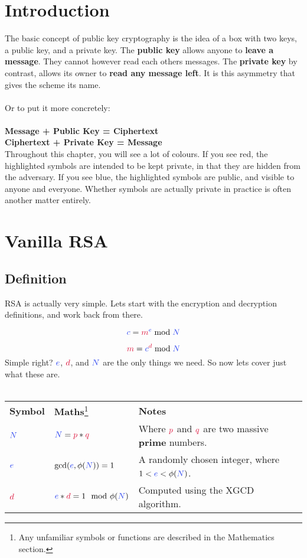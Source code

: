
\section{Introduction}

	The basic concept of public key cryptography is the idea of a box with two keys, a public key, and a private key. The \textbf{public key} allows anyone to \textbf{leave a message}. They cannot however read each others messages. The \textbf{private key} by contrast, allows its owner to \textbf{read any message left}. It is this asymmetry that gives the scheme its name.\\
	\\
	Or to put	it more concretely:\\
	\\
	\textbf{Message + \textcolor{B}{Public Key} = Ciphertext}\\
	\textbf{Ciphertext + \textcolor{R}{Private Key} = Message}\\

	Throughout this chapter, you will see a lot of colours. If you see \textcolor{R}{red}, the highlighted symbols are intended to be kept \textcolor{R}{private}, in that they are hidden from the adversary. If you see \textcolor{B}{blue}, the highlighted symbols are \textcolor{B}{public}, and visible to anyone and everyone. Whether  symbols are actually private in practice is often another matter entirely.

\section{Vanilla RSA}

	\subsection{Definition}

		RSA is actually very simple. Lets start with the encryption and decryption definitions, and work back from there.

		$$ \cc = \cm^{\ce} \bmod \cN $$

		$$ \cm = \cc^{\cd} \bmod \cN $$
		Simple right? $\ce$, $\cd$, and $\cN$ are the only things we need. So now lets cover just what these are.\\
		\\
	  \begin{tabularx}{\linewidth}{l l X}
		  \textbf{Symbol} & \textbf{Maths}\footnote{Any unfamiliar symbols or functions are described in the Mathematics section.} & \textbf{Notes}\\
		  $\textcolor{B}{N}$ & $\cN = \cp * \cq$ & Where $\cp$ and $\cq$ are two massive \textbf{prime} numbers.
		  \\
		  $\ce$ & $\gcd(\ce,\phi(\cN))=1$ & A randomly chosen integer, where $1 < \ce < \phi(\cN)$.
		  \\
		  $\cd$ & $\ce*\cd = 1 \mod \phi(\cN)$ & Computed using the XGCD algorithm.
		  \\
	  \end{tabularx}
	  
